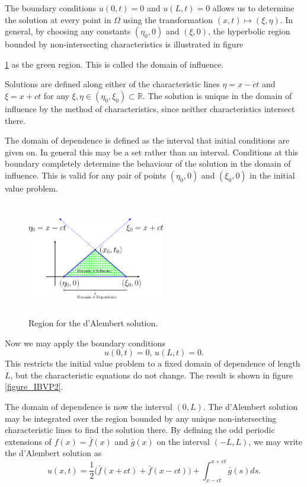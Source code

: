 \documentclass[12pt]{article}
\theoremstyle{definition}
\numberwithin{equation}{section}
\begin{document}
The boundary conditions $u(0,t)=0$ and $u(L,t)=0$ allows us to determine the solution at every point in $\Omega$ using the transformation $(x,t)\mapsto(\xi,\eta)$. In general, by choosing any constants $(\eta_0,0)$ and $(\xi,0)$, the hyperbolic region bounded by non-intersecting characteristics is illustrated in figure {\ref{figure_IBVP1} as the green region. This is called the domain of influence.

Solutions are defined along either of the characteristic lines $\eta=x-ct$ and $\xi=x+ct$ for any $\xi,\eta\in(\eta_0,\xi_0)\subset\mathbb{R}$. The solution is unique in the domain of influence by the method of characteristics, since neither characteristics intersect there.

The domain of dependence is defined as the interval that initial conditions are given on. In general this may be a set rather than an interval. Conditions at this boundary completely determine the behaviour of the solution in the domain of influence. This is valid for any pair of points $(\eta_0,0)$ and $(\xi_0,0)$ in the initial value problem.
\begin{figure}[h!]
\centerline{\includegraphics[height = 50mm, width=60mm, angle=0]{IBVP1.eps}}
\caption{Region for the d'Alembert solution.}
\label{figure_IBVP1}
\end{figure}

Now we may apply the boundary conditions $$u(0,t)=0,\, u(L,t)=0.$$
This restricts the initial value problem to a fixed domain of dependence of length $L$, but the characteristic equations do not change. The result is shown in figure \ref{figure_IBVP2}.

The domain of dependence is now the interval $(0,L)$. The d'Alembert solution may be integrated over the region bounded by any unique non-intersecting characteristic lines to find the solution there. By defining the odd periodic extensions of $f(x)=\bar{f}(x)$ and $\bar{g}(x)$ on the interval $(-L,L)$, we may write the d'Alembert solution as
\begin{equation}
u(x,t)=\frac{1}{2}\Big(\bar{f}(x+ct)+\bar{f}(x-ct)\Big)+\int_{x-ct}^{x+ct}\bar{g}(s)ds.
\end{equation}

}
\end{document}
